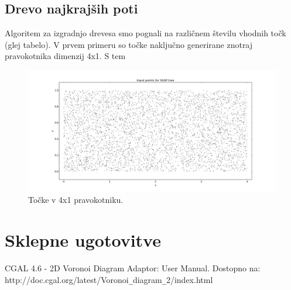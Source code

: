 \documentclass[a4paper, 12pt]{book}
\begin{document}
\section{Drevo najkrajših poti}
Algoritem za izgradnjo drevesa smo pognali na različnem številu vhodnih točk (glej tabelo). V prvem primeru so točke naključno generirane znotraj pravokotnika dimenzij 4x1. S tem 
\begin{figure}
\centerline{\includegraphics[scale=0.3]{pics/w_points5000-1.png}}
\caption{Točke v 4x1 pravokotniku.}
\label{adsr}
\end{figure}


\chapter{Sklepne ugotovitve}
\label{ch4}

\begin{thebibliography}{99}
CGAL 4.6 - 2D Voronoi Diagram Adaptor: User Manual. Dostopno na:\\ http://doc.cgal.org/latest/Voronoi\texttt{\_}diagram\texttt{\_}2/index.html

\end{thebibliography}
\end{document}
